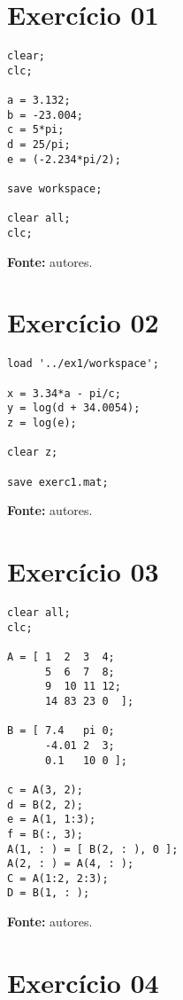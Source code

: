 \documentclass{article}
\newcommand{\leg}[1]{
    \begin{center}
    \textbf{Fonte: } #1.
    \end{center}
    \vspace{0.5cm}
}
\begin{document}
\section*{Exercício 01}
\vspace{0.2cm}

\begin{verbatim}
clear;
clc;

a = 3.132;
b = -23.004;
c = 5*pi;
d = 25/pi;
e = (-2.234*pi/2);

save workspace;

clear all;
clc;

\end{verbatim}
\leg{autores}
\section*{Exercício 02}
\vspace{0.2cm}

\begin{verbatim}
load '../ex1/workspace';

x = 3.34*a - pi/c;
y = log(d + 34.0054);
z = log(e); 

clear z;

save exerc1.mat;
\end{verbatim}
\leg{autores}
\section*{Exercício 03}
\vspace{0.2cm}

\begin{verbatim}
clear all;
clc;

A = [ 1  2  3  4; 
      5  6  7  8;
      9  10 11 12;
      14 83 23 0  ];
      
B = [ 7.4   pi 0;
      -4.01 2  3;
      0.1   10 0 ];
      
c = A(3, 2);
d = B(2, 2);
e = A(1, 1:3);
f = B(:, 3);
A(1, : ) = [ B(2, : ), 0 ];
A(2, : ) = A(4, : );
C = A(1:2, 2:3);
D = B(1, : );
\end{verbatim}
\leg{autores}
\section*{Exercício 04}
\vspace{0.2cm}
\end{document}
